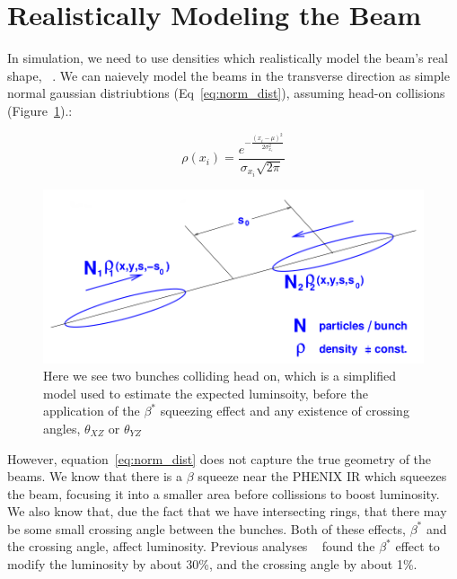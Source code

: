 \section{Realistically Modeling the Beam}
In simulation, we need to use densities which realistically model the beam's
real shape, ~\cite{herr2006lumi}. We can naievely model the beams in the
transverse direction as simple normal gaussian distriubtions
(Eq~\ref{eq:norm_dist}), assuming head-on collisions
(Figure~\ref{fig:simple_bunch_head_on}).:

\begin{equation}
  \label{eq:norm_dist}
  \rho(x_{i}) = \frac{e^{ -\frac{(x_{i}-\mu)^2}{2\sigma_{x_i}^2}}}{\sigma_{x_i}\sqrt{2\pi}}
\end{equation}

\begin{figure}[ht]
  \begin{center}
    \includegraphics[width=\linewidth,height=\textheight,keepaspectratio]{./figures/simple_bunch_head_on}
    \caption{ 
      Here we see two bunches colliding head on, which is a simplified model
      used to estimate the expected luminsoity, before the application of the
      $\beta^{*}$ squeezing effect and any existence of crossing angles,
      $\theta_{XZ}$ or $\theta_{YZ}$ 
    }
    \label{fig:simple_bunch_head_on}
  \end{center}
\end{figure}

However, equation~\ref{eq:norm_dist} does not capture the true geometry of the
beams. We know that there is a $\beta$ squeeze near the PHENIX IR which squeezes
the beam, focusing it into a smaller area before collissions to boost
luminosity.  We also know that, due the fact that we have intersecting rings,
that there may be some small crossing angle between the bunches. Both of these
effects, $\beta^{*}$ and the crossing angle, affect luminosity. Previous
analyses ~\cite{an888} found the $\beta^{*}$ effect to modify the luminosity by
about 30\%, and the crossing angle by about 1\%.

